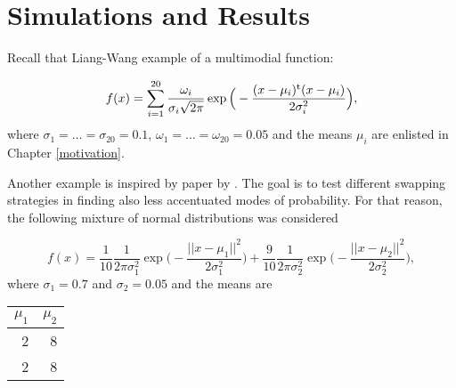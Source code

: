 \chapter{ Simulations and Results }\label{simulationsAndResults}

Recall that Liang-Wang example of a multimodial function:

\begin{equation*}
f(x) = 
\sum_{i=1}^{20} \frac{\omega_i}{ \sigma_i \sqrt{2 \pi} } \exp \Big( -\frac{(x - \mu_i)^{\mathrm{t}} (x - \mu_i)}{2 \sigma_i^2} \Big),	
\end{equation*}
where $\sigma_1 = \dots = \sigma_{20} = 0.1$, $\omega_1 = \dots = \omega_{20} = 0.05 $ and the means $\mu_i$ are enlisted in Chapter \ref{motivation}.


Another example is inspired by paper by \cite{BaragattiLikelihoodFreeParallelTempering}. The goal is to test different swapping strategies in finding also less accentuated modes of probability. For that reason, the following mixture of normal distributions was considered

\begin{equation*}
f(x) = 
 	\frac{1}{10} \frac{1}{2 \pi \sigma_1^2} \exp \Big( -\frac{ ||x - \mu_1||^2}{2 \sigma_1^2} \Big) +
 	\frac{9}{10} \frac{1}{2 \pi \sigma_2^2} \exp \Big( -\frac{ ||x - \mu_2||^2}{2 \sigma_2^2} \Big)
 	,	
\end{equation*}
where $\sigma_1 = 0.7$ and $\sigma_2 = 0.05$ and the means are 

\begin{table}[ht]
	\centering
	\begin{tabular}{rr}
	  	\hline
			$\mu_1$ & $\mu_2$ \\ 
	  	\hline
			2 & 8 \\ 
			2 & 8 \\ 
	   	\hline
	\end{tabular}
\end{table}